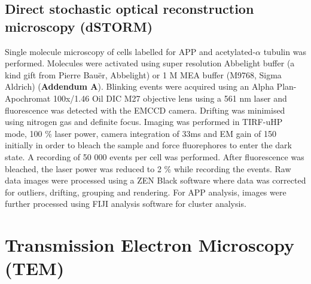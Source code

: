 \subsection{Direct stochastic optical reconstruction microscopy (dSTORM)}
Single molecule microscopy of cells labelled for APP and acetylated-$\alpha$ tubulin was performed. Molecules were activated using super resolution Abbelight buffer (a kind gift from Pierre Bauër, Abbelight) or 1 M MEA buffer (M9768, Sigma Aldrich) (\textbf{Addendum A}). Blinking events were acquired using an Alpha Plan-Apochromat 100x/1.46 Oil DIC M27 objective lens using a 561 nm laser and fluorescence was detected with the EMCCD camera. Drifting was minimised using nitrogen gas and definite focus. Imaging was performed in TIRF-uHP mode, 100 \% laser power, camera integration of 33ms and EM gain of 150 initially in order to bleach the sample and force fluorephores to enter the dark state. A recording of 50 000 events per cell was performed. After fluorescence was bleached, the laser power was reduced to 2 \% while recording the events. Raw data images were processed using a ZEN Black software where data was corrected for outliers, drifting, grouping and rendering. For APP analysis, images were further processed using FIJI analysis software for cluster analysis. 

\section{Transmission Electron Microscopy (TEM)}
